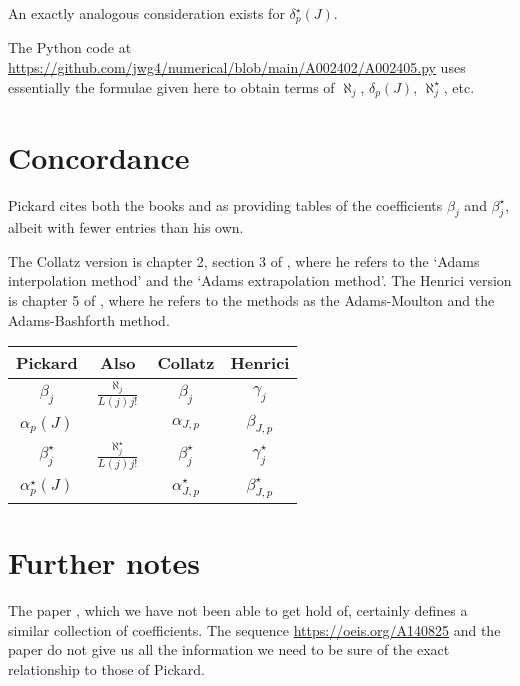 \documentclass{article}
\begin{document}
An exactly analogous consideration exists for $\delta^{\star}_p(J)$.

The Python code at \url{https://github.com/jwg4/numerical/blob/main/A002402/A002405.py} uses essentially the formulae given here to obtain terms of $\aleph_j$, $\delta_p(J)$, $\aleph^{\star}_j$, etc.

\section{Concordance}
Pickard cites both the books \cite{collatz} and \cite{henrici} as providing tables of the coefficients $\beta_j$ and $\beta^{\star}_j$, albeit with fewer entries than his own.

The Collatz version is chapter 2, section 3 of \cite{collatz}, where he refers to the `Adams interpolation method' and the `Adams extrapolation method'. The Henrici version is chapter 5 of \cite{henrici}, where he refers to the methods as the Adams-Moulton and the Adams-Bashforth method.

\begin{center}
\begin{tabular}{|c|c|c|c|}
\hline
Pickard \cite{pickard} & Also & Collatz \cite{collatz} & Henrici \cite{henrici} \\ 
\hline
$\beta_j$ & $\frac{\aleph_j}{L(j)j!}$ & $\beta_j$ & $\gamma_j$ \\
$\alpha_p(J)$ & & $\alpha_{J, p}$ & $\beta_{J, p}$ \\
$\beta^{\star}_j$ & $\frac{\aleph^{\star}_j}{L(j)j!}$ & $\beta_j^{\star}$ & $\gamma^{\star}_j$ \\
$\alpha^{\star}_p(J)$ & & $\alpha^{\star}_{J, p}$ & $\beta^{\star}_{J, p}$ \\
\hline
\end{tabular}
\end{center}

\section{Further notes}
The paper \cite{curtz}, which we have not been able to get hold of, certainly defines a similar collection of coefficients. The sequence \url{https://oeis.org/A140825} and the paper \cite{flajolet} do not give us all the information we need to be sure of the exact relationship to those of Pickard.




\end{document}
